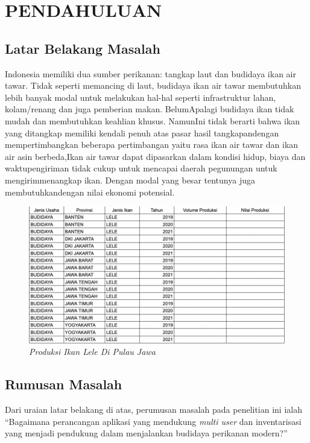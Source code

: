 
\chapter{PENDAHULUAN}

\section{Latar Belakang Masalah}

Indonesia memiliki dua sumber perikanan: tangkap laut dan budidaya ikan air tawar. Tidak seperti memancing di laut, budidaya ikan air tawar membutuhkan lebih banyak modal untuk melakukan hal-hal seperti infrastruktur lahan, kolam/renang dan juga pemberian makan. BelumApalagi budidaya ikan  tidak mudah dan membutuhkan keahlian khusus. NamunIni tidak berarti bahwa ikan yang ditangkap memiliki kendali penuh atas pasar hasil tangkapandengan mempertimbangkan beberapa pertimbangan yaitu rasa ikan air tawar dan ikan air asin berbeda,Ikan air tawar  dapat dipasarkan dalam kondisi hidup, biaya dan waktupengiriman tidak cukup untuk mencapai daerah pegunungan untuk mengirimmenangkap ikan. Dengan modal yang besar tentunya  juga membutuhkandengan nilai ekonomi potensial.

\begin{figure}[H]
	\centering
	\includegraphics[keepaspectratio, width=12cm]{gambar/budidaya-ikan-lele-jawa.png}
	\caption{\emph{Produksi Ikan Lele Di Pulau Jawa} \citep{kkpdatajawa}}
	\label{gambar:budidaya-ikan-lele-jawa}
\end{figure}

\section{Rumusan Masalah}
Dari uraian latar belakang di atas, perumusan masalah pada penelitian ini ialah “Bagaimana perancangan aplikasi yang mendukung \emph{multi user} dan inventarisasi yang menjadi pendukung dalam menjalankan budidaya perikanan modern?”

